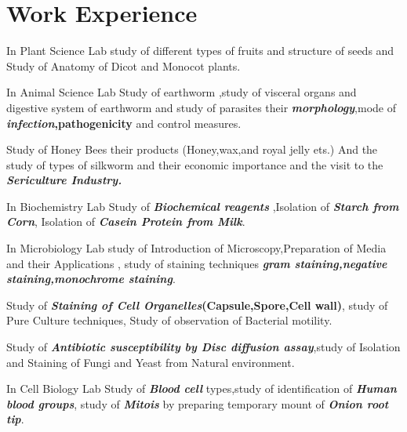 \documentclass[]{kajalverse-resume}
\begin{document}
\hfill
\begin{minipage}[t]{0.66\textwidth}


\section{Work Experience}
\runsubsection{}
\vspace{\topsep}
\begin{tightemize}
\item In Plant Science Lab study of different types of fruits and structure of seeds  
% 
\textbf{\textit{}} and Study of Anatomy of Dicot and Monocot plants.
\item In Animal Science Lab Study of earthworm ,study of visceral organs and digestive system  of earthworm\textbf{} and study of parasites their \textit{\textbf{morphology}},mode of \textbf{\textit{infection},pathogenicity} and control measures.
\item Study of Honey Bees their products (Honey,wax,and royal jelly ets.)  And the study of types of silkworm and their economic importance and the visit to the \textbf{\textit{Sericulture Industry.}}
\item In Biochemistry Lab Study of\textbf{\textit{ Biochemical reagents}} \textbf{} ,Isolation of \textbf{\textit{Starch from Corn}}, Isolation of\textbf{\textit{ Casein Protein from Milk}}.
\item In Microbiology Lab study of Introduction of Microscopy,Preparation of Media and their Applications \textbf{}, study of staining techniques \textbf{\textit{gram staining,negative staining,monochrome staining}}.
\item Study of\textbf{\textit{ Staining of Cell Organelles}(Capsule,Spore,Cell wall)}, \textbf{} study of Pure Culture techniques, Study of observation of Bacterial motility.
\item Study of\textbf{\textit{ Antibiotic susceptibility by Disc diffusion assay}},study of Isolation and Staining of Fungi and Yeast from Natural environment.
\item In Cell Biology Lab Study of\textbf{\textit{ Blood cell}} types,study of identification of\textbf{\textit{ Human blood groups}}, \textbf{} study of \textbf{\textit{Mitois}} by preparing temporary mount of\textbf{\textit{ Onion root tip}}.

\end{tightemize}
\end{minipage}
\end{document}
